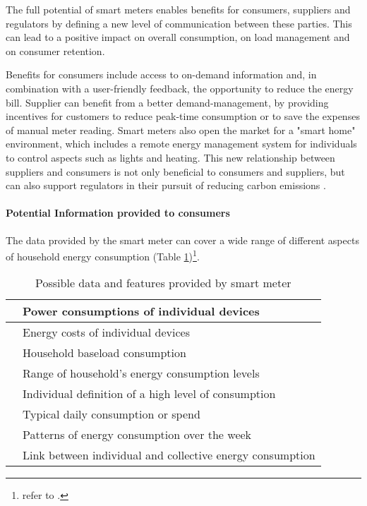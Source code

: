 The full potential of smart meters enables benefits for consumers, suppliers and regulators by defining a new level of communication between these parties.  This can lead to a positive impact on overall consumption, on load management and on consumer retention.

Benefits for consumers include access to on-demand information and, in combination with a user-friendly feedback, the opportunity to reduce the energy bill.
Supplier can benefit from a better demand-management, by providing incentives for customers to reduce peak-time consumption or to save the expenses of manual meter reading. Smart meters also open the market for a "smart home" environment, which includes a remote energy management system for individuals to control aspects such as lights and heating.
This new relationship between suppliers and consumers is not only beneficial to consumers and suppliers, but can also support regulators in their pursuit of reducing carbon emissions  \citep{Darby2008}.

\paragraph{Potential Information provided to consumers}

The data provided by the smart meter can cover a wide range of different aspects of household energy consumption (Table \ref{tab:Information})\footnote{refer to \citep{WillAnderson2009}.}.
\begin{table}[htbp] %
  \centering
  \caption{Possible data and features provided by smart meter}
    \begin{tabular}{|cl|}
    \hline
          & Power consumptions of individual devices \bigstrut\\
    \hline
          & Energy costs of individual devices \bigstrut\\
    \hline
          & Household baseload consumption \bigstrut\\
    \hline
          & Range of household's energy consumption levels \bigstrut\\
    \hline
          & Individual definition of a high level of consumption \bigstrut\\
    \hline
          & Typical daily consumption or spend \bigstrut\\
    \hline
          & Patterns of energy consumption over the week \bigstrut\\
    \hline
          & Link between individual and collective energy consumption \bigstrut\\
    \hline
    \end{tabular}%

  \label{tab:Information}%
\end{table}%

